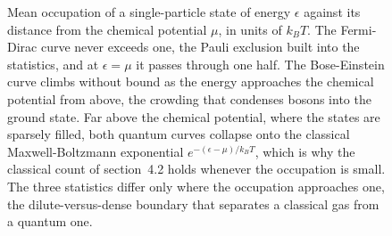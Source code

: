 \begin{figure}[htbp]
\centering
{}
\caption[The three occupation statistics: Bose-Einstein, Fermi-Dirac, and
Maxwell-Boltzmann]{Mean occupation of a single-particle state of energy
$\epsilon$ against its distance from the chemical potential $\mu$, in units of
$k_B T$. The Fermi-Dirac curve never exceeds one, the Pauli exclusion built
into the statistics, and at $\epsilon=\mu$ it passes through one half. The
Bose-Einstein curve climbs without bound as the energy approaches the chemical
potential from above, the crowding that condenses bosons into the ground state.
Far above the chemical potential, where the states are sparsely filled, both
quantum curves collapse onto the classical Maxwell-Boltzmann exponential
$e^{-(\epsilon-\mu)/k_B T}$, which is why the classical count of section~4.2
holds whenever the occupation is small. The three statistics differ only where
the occupation approaches one, the dilute-versus-dense boundary that separates
a classical gas from a quantum one.}
\label{fig:vol04ch04:quantum-statistics}
\end{figure}
